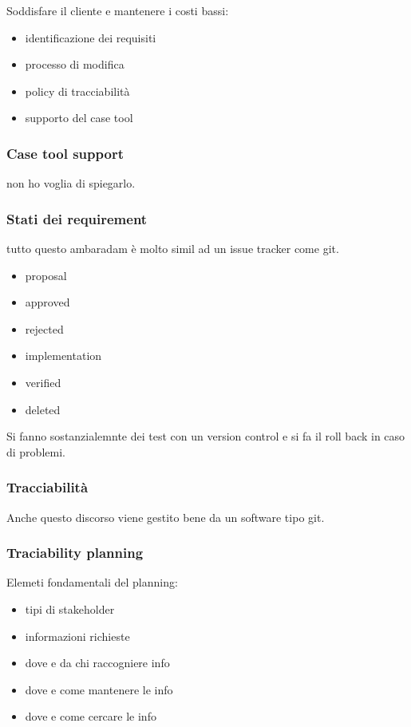 \documentclass{article}
\begin{document}
Soddisfare il cliente e mantenere i costi bassi:
\begin{itemize}
    \item identificazione dei requisiti
    \item processo di modifica
    \item policy di tracciabilità
    \item supporto del case tool
\end{itemize}
\subsubsection{Case tool support}
non ho voglia di spiegarlo.
\subsubsection{Stati dei requirement}
tutto questo ambaradam è molto simil ad un issue tracker come git.
\begin{itemize}
    \item proposal
    \item approved
    \item rejected
    \item implementation
    \item verified
    \item deleted
\end{itemize}

Si fanno sostanzialemnte dei test con un version control e si fa il roll back
in caso di problemi.

\subsubsection{Tracciabilità}
Anche questo discorso viene gestito bene da un software tipo git.

\subsubsection{Traciability planning}
Elemeti fondamentali del planning:
\begin{itemize}
    \item tipi di stakeholder
    \item informazioni richieste
    \item dove e da chi raccogniere info
    \item dove e come mantenere le info
    \item dove e come cercare le info
\end{itemize}
\end{document}
